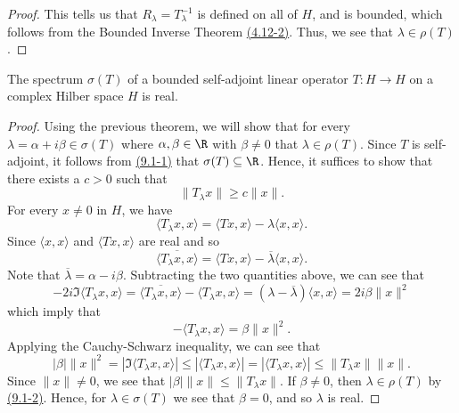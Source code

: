 \begin{proof}
This tells us that \( {R}_{\lambda} = T^{-1}_{\lambda} \) is defined on all of \( H  \), and is bounded, which follows from the Bounded Inverse Theorem {\hyperref[(4.12-2)]{(4.12-2)}}. Thus, we see that \( \lambda \in \rho(T) \).
\end{proof}

\begin{theorem}[Spectrum]
    The spectrum \( \sigma(T) \) of a bounded self-adjoint linear operator \( T: H \to H  \) on a complex Hilber space \( H  \) is real. 
\end{theorem}
\begin{proof}
    Using the previous theorem, we will show that for every \( \lambda = \alpha + i \beta \in \sigma(T)  \) where \( \alpha, \beta \in \R  \) with \( \beta \neq 0  \) that \( \lambda \in \rho(T) \). Since \( T \) is self-adjoint, it follows from {\hyperref[(9,1-1)]{(9.1-1)}} that \( \sigma(T) \subseteq \R  \). Hence, it suffices to show that there exists a \( c > 0  \) such that \[  \|{T}_{\lambda}x\| \geq c \|x \|. \tag{*} \] 
    For every \( x \neq 0  \) in \( H  \), we have 
    \[  \langle {T}_{\lambda}x  , x  \rangle = \langle Tx  ,  x  \rangle - \lambda \langle x , x  \rangle. \]
    Since \( \langle x , x \rangle  \) and \( \langle Tx , x  \rangle  \) are real and so 
    \[  \overline{\langle {T}_{\lambda}x  ,  x  \rangle} = \langle Tx  ,  x  \rangle - \overline{\lambda } \langle x , x \rangle.  \]
    Note that \( \overline{\lambda} = \alpha - i \beta  \). Subtracting the two quantities above, we can see that 
    \[ -2i \Im \langle {T}_{\lambda}x  , x  \rangle =  \overline{\langle {T}_{\lambda}x  ,  x  \rangle } - \langle {T}_{\lambda}x  ,  x  \rangle = (\lambda - \overline{\lambda}) \langle x , x \rangle = 2 i \beta \|x\|^{2} \]
    which imply that 
    \[  - \langle {T}_{\lambda}x  ,  x  \rangle = \beta \|x\|^{2}. \]
    Applying the Cauchy-Schwarz inequality, we can see that 
    \[  | \beta | \|x\|^{2} = | \Im \langle {T}_{\lambda}x  ,  x \rangle | \leq | \langle {T}_{\lambda}x  ,  x  \rangle | = | \langle {T}_{\lambda}x  ,  x  \rangle  |  \leq \|{T}_{\lambda}x \| \|x\|. \]
    Since \( \|x \| \neq 0  \), we see that \( | \beta  | \|x \| \leq \|{T}_{\lambda}x \| \). If \( \beta \neq 0  \), then \( \lambda \in \rho(T) \) by {\hyperref[(9.1-2)]{(9.1-2)}}. Hence, for \( \lambda \in \sigma(T) \) we see that \( \beta = 0  \), and so \( \lambda  \) is real. 
    
\end{proof}
